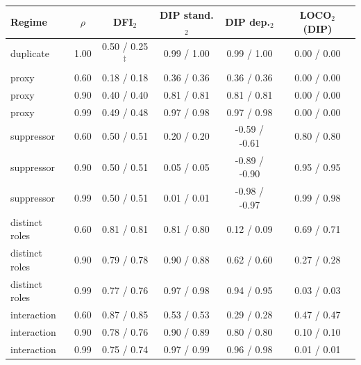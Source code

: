 \begin{table}[htbp]\centering\scriptsize
\caption{}\label{tab:official}
\begin{tabular}{lc|cccc}\toprule
Regime & $\rho$ & DFI$_2$ & DIP stand.$_2$ & DIP dep.$_2$ & LOCO$_2$ (DIP) \\\midrule
duplicate & 1.00 & 0.50 / 0.25$^\ddagger$ & 0.99 / 1.00 & 0.99 / 1.00 & 0.00 / 0.00 \\
proxy & 0.60 & 0.18 / 0.18 & 0.36 / 0.36 & 0.36 / 0.36 & 0.00 / 0.00 \\
proxy & 0.90 & 0.40 / 0.40 & 0.81 / 0.81 & 0.81 / 0.81 & 0.00 / 0.00 \\
proxy & 0.99 & 0.49 / 0.48 & 0.97 / 0.98 & 0.97 / 0.98 & 0.00 / 0.00 \\
suppressor & 0.60 & 0.50 / 0.51 & 0.20 / 0.20 & -0.59 / -0.61 & 0.80 / 0.80 \\
suppressor & 0.90 & 0.50 / 0.51 & 0.05 / 0.05 & -0.89 / -0.90 & 0.95 / 0.95 \\
suppressor & 0.99 & 0.50 / 0.51 & 0.01 / 0.01 & -0.98 / -0.97 & 0.99 / 0.98 \\
distinct roles & 0.60 & 0.81 / 0.81 & 0.81 / 0.80 & 0.12 / 0.09 & 0.69 / 0.71 \\
distinct roles & 0.90 & 0.79 / 0.78 & 0.90 / 0.88 & 0.62 / 0.60 & 0.27 / 0.28 \\
distinct roles & 0.99 & 0.77 / 0.76 & 0.97 / 0.98 & 0.94 / 0.95 & 0.03 / 0.03 \\
interaction & 0.60 & 0.87 / 0.85 & 0.53 / 0.53 & 0.29 / 0.28 & 0.47 / 0.47 \\
interaction & 0.90 & 0.78 / 0.76 & 0.90 / 0.89 & 0.80 / 0.80 & 0.10 / 0.10 \\
interaction & 0.99 & 0.75 / 0.74 & 0.97 / 0.99 & 0.96 / 0.98 & 0.01 / 0.01 \\
\bottomrule\end{tabular}\end{table}
